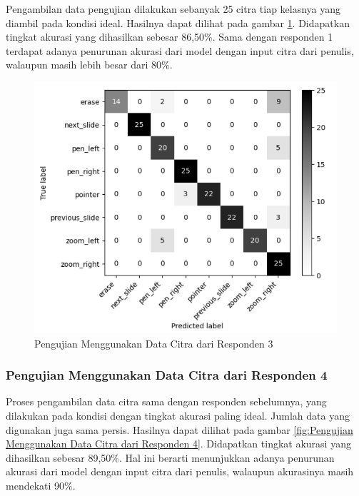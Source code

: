 Pengambilan data pengujian dilakukan sebanyak 25 citra tiap kelasnya yang diambil pada kondisi ideal. Hasilnya dapat dilihat pada gambar \ref{fig:Pengujian Menggunakan Data Citra dari Responden 3}. Didapatkan tingkat akurasi yang dihasilkan sebesar 86,50\%. Sama dengan responden 1 terdapat adanya penurunan akurasi dari model dengan input citra dari penulis, walaupun masih lebih besar dari 80\%. 

\begin{figure}[ht]
  \centering
  \includegraphics[scale=0.5]{gambar/pengujian-ukuran-tangan/tangan-meril.png}
  \caption{Pengujian Menggunakan Data Citra dari Responden 3}
  \label{fig:Pengujian Menggunakan Data Citra dari Responden 3}
\end{figure}

\subsubsection{Pengujian Menggunakan Data Citra dari Responden 4}
\label{subsec:Pengujian Menggunakan Data Citra dari Responden 4}

Proses pengambilan data citra sama dengan responden sebelumnya, yang dilakukan pada kondisi dengan tingkat akurasi paling ideal. Jumlah data yang digunakan juga sama persis. Hasilnya dapat dilihat pada gambar \ref{fig:Pengujian Menggunakan Data Citra dari Responden 4}. Didapatkan tingkat akurasi yang dihasilkan sebesar 89,50\%. Hal ini berarti menunjukkan adanya penurunan akurasi dari model dengan input citra dari penulis, walaupun akurasinya masih mendekati 90\%.

